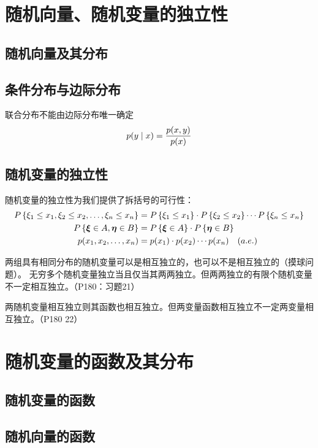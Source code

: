 \section{随机向量、随机变量的独立性}
\subsection{随机向量及其分布}
\subsection{条件分布与边际分布}
联合分布不能由边际分布唯一确定
\[
    p(y\mid x)=\frac{p(x,y)}{p(x)} \\
\]

\subsection{随机变量的独立性}
随机变量的独立性为我们提供了拆括号的可行性：
\begin{align*}
    P\left\{\xi_{1} \leq x_{1}, \xi_{2} \leq x_{2}, \dots ,
    \xi_{n} \leq x_{n}\right\} &=
    P\left\{\xi_{1} \leq x_{1}\right\} \cdot
    P\left\{\xi_{2} \leq x_{2}\right\} \cdots
    P\left\{\xi_{n} \leq x_{n}\right\}\\
    P\left\{\bm{\xi} \in A, \bm{\eta} \in B\right\} &=
    P\left\{\bm{\xi} \in A\right\} \cdot
    P\left\{\bm{\eta} \in B\right\} \\
    p(x_{1},x_{2},\ldots,x_{n}) &= p(x_{1}) \cdot p(x_{2})
    \cdots p(x_{n}) \quad (a. e.)
\end{align*}

两组具有相同分布的随机变量可以是相互独立的，也可以不是相互独立的（摸球问题）。
无穷多个随机变量独立当且仅当其两两独立。但两两独立的有限个随机变量不一定相互独立。（P180：习题21）

两随机变量相互独立则其函数也相互独立。但两变量函数相互独立不一定两变量相互独立。（P180 22）

\section{随机变量的函数及其分布}
\subsection{随机变量的函数}
\subsection{随机向量的函数}

